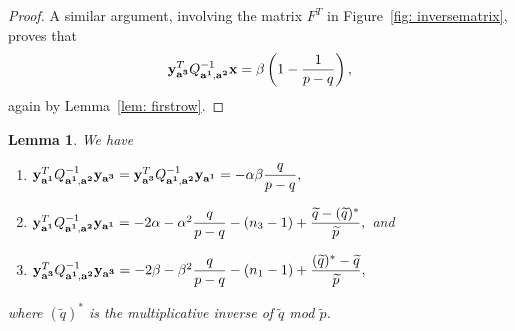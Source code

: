 \documentclass[11pt]{amsart}
\theoremstyle{plain}
\newtheorem{lemma}[theorem]{Lemma}
\theoremstyle{definition}
\theoremstyle{remark}
\numberwithin{theorem}{section}
\begin{document}
\begin{proof}
 A similar argument, involving the matrix $F^T$  in Figure~\ref{fig: inversematrix}, proves that $${\bf y}^T_{\bf a^3} Q^{-1}_{{\bf a^1}, {\bf a^2}} {\bf x}= \beta \left(1 - \dfrac{1}{p-q}\right),$$ again by  Lemma~\ref{lem: firstrow}. 
\end{proof} 


\begin{lemma} \label{lem: 3items} We have 
\begin{enumerate}[label=(\roman*)]
        \item   ${\bf y}^T_{\bf a^1} Q^{-1}_{{\bf a^1}, {\bf a^2}} {\bf y_{a^3}} = {\bf y}^T_{\bf a^3} Q^{-1}_{{\bf a^1}, {\bf a^2}} {\bf y_{a^1}} =-\alpha \beta\dfrac{q}{p-q},$
        \item ${\bf y}^T_{\bf a^1} Q^{-1}_{{\bf a^1}, {\bf a^2}} {\bf y_{a^1}} = -2\alpha - \alpha^2 \dfrac{q}{p-q} -(n_3-1) + \dfrac{\widetilde{q} - (\widetilde{q})^*}{\widetilde{p}},$ and
        \item ${\bf y}^T_{\bf a^3} Q^{-1}_{{\bf a^1}, {\bf a^2}} {\bf y_{a^3}} = -2\beta - \beta^2 \dfrac{q}{p-q} -(n_1-1) + \dfrac{(\widetilde{q})^* - \widetilde{q}}{\widetilde{p}},$
    \end{enumerate}
where $(\widetilde{q})^*$ is the multiplicative inverse of $\widetilde{q}$ mod $\widetilde{p}$. 
\end{lemma}
\end{document}

